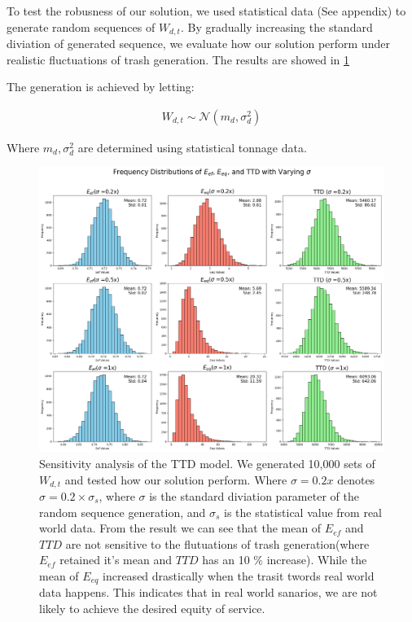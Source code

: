\documentclass[20pt]{article}
\theoremstyle{definition}
\begin{document}
To test the robusness of our solution, we used statistical data (See appendix) to generate random sequences of $W_{d,t}$. By gradually increasing the standard diviation of generated sequence, we evaluate how our solution perform under realistic fluctuations of trash generation. The results are showed in \cref{fig:ttdsen} 

		The generation is achieved by letting:

		\begin{align}
			W_{d,t} \sim \mathcal{N}(m_d, \sigma_d^2)
		\end{align}

		Where $ m_d, \sigma_d^2$ are determined using statistical tonnage data.


\begin{figure}[H]
	\centering
	\includegraphics[width=1\textwidth]{figures/sen.png}
	\caption{Sensitivity analysis of the TTD model. We generated 10,000 sets of $ W_{d,t}$ and tested how our solution perform. Where $ \sigma = 0.2x$ denotes $ \sigma = 0.2 \times \sigma_s$, where $ \sigma$ is the standard diviation parameter of the random sequence generation, and $ \sigma_s$ is the statistical value from real world data. 
	From the result we can see that the mean of $ E_{ef} $ and $ TTD$ are not sensitive to the flutuations of trash generation(where $ E_{ef}$ retained it's mean and $ TTD$ has an 10 \% increase). While the mean of $ E_{eq}$ increased drastically when the trasit twords real world data happens. This indicates that in real world sanarios, we are not likely to achieve the desired equity of service.   }
	\label{fig:ttdsen}
\end{figure}
\end{document}
